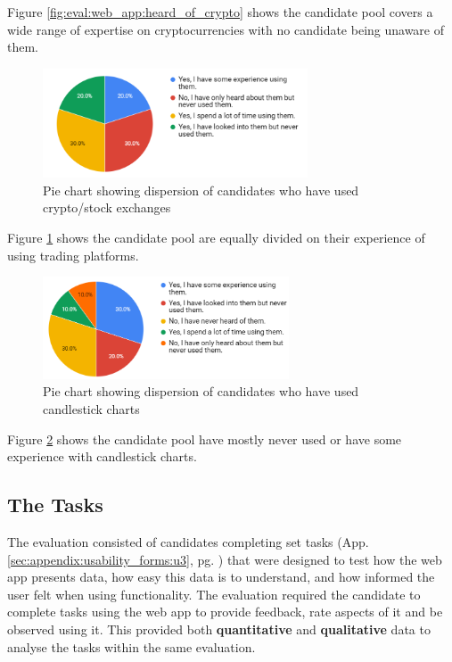 \noindent Figure \ref{fig:eval:web_app:heard_of_crypto} shows the candidate pool covers a wide range of expertise on cryptocurrencies with no candidate being unaware of them.



  \begin{figure}[ht]
  \centering
 \includegraphics[width=0.7\textwidth]{content/graphics/exp_with_crypto.PNG}
  \caption{Pie chart showing dispersion of candidates who have used crypto/stock exchanges}
  \label{fig:eval:web_app:exp_with_crypto}
\end{figure}

\noindent Figure \ref{fig:eval:web_app:exp_with_crypto} shows the candidate pool are equally divided on their experience of using trading platforms.

  \begin{figure}[ht]
  \centering
 \includegraphics[width=0.65\textwidth]{content/graphics/exp_with_kline.PNG}
  \caption{Pie chart showing dispersion of candidates who have used candlestick charts}
  \label{fig:eval:web_app:exp_with_kline}
\end{figure}

\noindent Figure \ref{fig:eval:web_app:exp_with_kline} shows the candidate pool have mostly never used or have some experience with candlestick charts.

\subsection{The Tasks}
\label{sec:evaluation:ui:tasks}
\noindent The evaluation consisted of candidates completing set tasks (App. \ref{sec:appendix:usability_forms:u3}, pg. \pageref{sec:appendix:usability_forms:u3}) that were designed to test how the web app presents data, how easy this data is to understand, and how informed the user felt when using functionality. The evaluation required the candidate to complete tasks using the web app to provide feedback, rate aspects of it and be observed using it. This provided both \textbf{quantitative} and \textbf{qualitative} data to analyse the tasks within the same evaluation.

